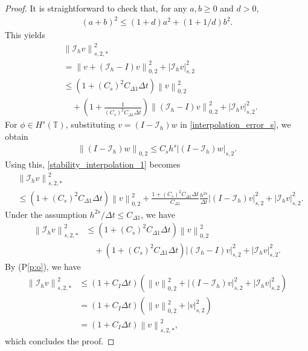 \documentclass[10pt,a4paper,tbtags,leqno]{amsart}
\theoremstyle{definition}
\numberwithin{equation}{section}
\def\norm#1#2{\left\|#2\right\|_{#1}}
\def\snorm#1#2{\left|#2\right|_{#1}}
\begin{document}
\begin{proof}
  It is straightforward to check that, for any $ a, b \geq 0 $ and $ d > 0 $, 
  \begin{align} 
    (a + b)^2 \leq (1 + d) a^2 + (1 + 1/d) b^2. \label{2-1} 
  \end{align} 
  This yields 
  \begin{align} 
    & \norm{s, 2, *}{\mathcal{I}_{h} v}^2 \\ & = \norm{0, 2}{v + (\mathcal{I}_{h} - I) v}^2 + \snorm{s, 2}{\mathcal{I}_{h} v}^2 \\ & \leq (1 + (C_s)^2 C_{\Delta 1} \Delta t) \norm{0, 2}{v}^2 \\ 
    & \quad + \left(1 + \frac{1}{(C_s)^2 C_{\Delta 1} \Delta t}\right) \norm{0, 2}{(\mathcal{I}_{h} - I) v}^2 + \snorm{s, 2}{\mathcal{I}_{h} v}^2. \label{stability_interpolation_1} 
  \end{align}  
  For $ \phi \in H^s (\mathbb{T}) $, substituting $ v = (I - \mathcal{I}_{h}) w $ in \eqref{interpolation_error_s}, we obtain 
  \begin{align} 
    \norm{0, 2}{(I - \mathcal{I}_{h}) w} \leq C_s h^s \snorm{s, 2}{(I - \mathcal{I}_{h}) w}. \label{2-2} 
  \end{align} 
  Using this, \eqref{stability_interpolation_1} becomes 
  \begin{align}
    & \norm{s, 2, *}{\mathcal{I}_{h} v}^2 \\ & \leq (1 + (C_s)^2 C_{\Delta 1} \Delta t) \norm{0, 2}{v}^2 + \frac{1 + (C_s)^2 C_{\Delta 1} \Delta t}{C_{\Delta 1}} \frac{h^{2s}}{\Delta t} \snorm{s, 2}{(I - \mathcal{I}_{h})v}^2 + \snorm{s, 2}{\mathcal{I}_{h} v}^2. 
  \end{align} 
  Under the assumption $ h^{2s} / \Delta t \leq C_{\Delta 1} $, we have 
  \begin{align} 
    \norm{s, 2, *}{\mathcal{I}_{h} v}^2 & \leq (1 + (C_s)^2 C_{\Delta 1} \Delta t) \norm{0, 2}{v}^2 \\ 
    & \quad + (1 + (C_s)^2 C_{\Delta 1} \Delta t) \snorm{s, 2}{(\mathcal{I}_{h} - I) v}^2 + \snorm{s, 2}{\mathcal{I}_{h} v}^2. 
  \end{align} 
  By (P\ref{p:o}), we have 
  \begin{align}
    \norm{s, 2, *}{\mathcal{I}_{h} v}^2 & \leq (1 + C_I \Delta t) \left(\norm{0, 2}{v}^2 + \snorm{s, 2}{(I - \mathcal{I}_{h}) v}^2 + \snorm{s, 2}{\mathcal{I}_{h} v}^2\right) \\
    & = (1 + C_I \Delta t) \left(\norm{0, 2}{v}^2 + \snorm{s, 2}{v}^2\right) \\
    & = (1 + C_I \Delta t)  \norm{s, 2, *}{v}^2, 
  \end{align}
  which concludes the proof. 
\end{proof} 
\end{document}
